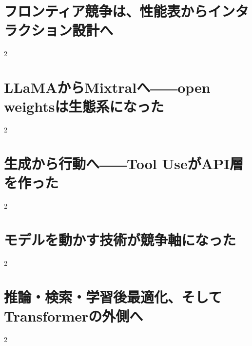 \documentclass[lualatex,a4paper,11pt]{jlreq}
\begin{document}
\surveycover
\clearpage


\clearpage
\section{フロンティア競争は、性能表からインタラクション設計へ}
\label{pkg:frontier-interface}

\medskip
\begin{multicols}{2}

\end{multicols}


\Needspace{0.45\textheight}
\bigskip
\section{LLaMAからMixtralへ――open weightsは生態系になった}
\label{pkg:open-weight-ecosystem}

\medskip
\begin{multicols}{2}

\end{multicols}


\Needspace{0.45\textheight}
\bigskip
\section{生成から行動へ――Tool UseがAPI層を作った}
\label{pkg:tool-action-layer}

\medskip
\begin{multicols}{2}

\end{multicols}


\Needspace{0.45\textheight}
\bigskip
\section{モデルを動かす技術が競争軸になった}
\label{pkg:runtime-adaptation}

\medskip
\begin{multicols}{2}

\end{multicols}


\Needspace{0.45\textheight}
\bigskip
\section{推論・検索・学習後最適化、そしてTransformerの外側へ}
\label{pkg:reasoning-retrieval-architecture}

\medskip
\begin{multicols}{2}

\end{multicols}

\end{document}
